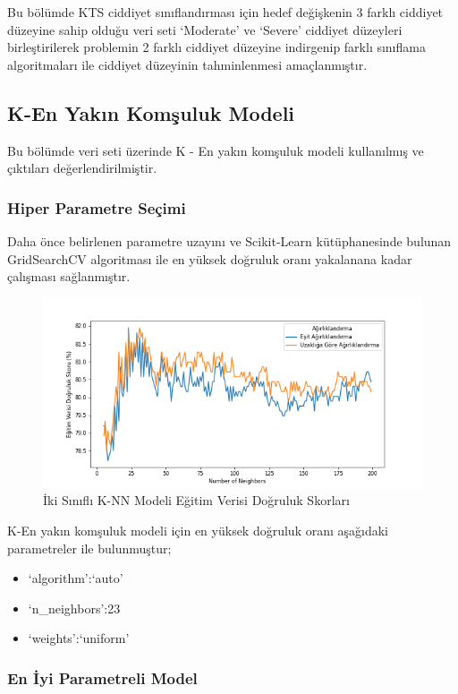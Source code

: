 \documentclass[12pt,twoside]{deuthesis}
\providecommand{\tightlist}{%
  \setlength{\itemsep}{0pt}\setlength{\parskip}{0pt}}
\begin{document}
Bu bölümde KTS ciddiyet sınıflandırması için hedef değişkenin 3 farklı ciddiyet düzeyine sahip olduğu veri seti `Moderate' ve `Severe' ciddiyet düzeyleri birleştirilerek problemin 2 farklı ciddiyet düzeyine indirgenip farklı sınıflama algoritmaları ile ciddiyet düzeyinin tahminlenmesi amaçlanmıştır.

\hypertarget{bin_knn}{%
\subsection{K-En Yakın Komşuluk Modeli}\label{bin_knn}}

Bu bölümde veri seti üzerinde K - En yakın komşuluk modeli kullanılmış ve çıktıları değerlendirilmiştir.

\hypertarget{hiper-parametre-seuxe7imi-4}{%
\subsubsection{Hiper Parametre Seçimi}\label{hiper-parametre-seuxe7imi-4}}

Daha önce belirlenen parametre uzayını ve Scikit-Learn kütüphanesinde bulunan GridSearchCV algoritması ile en yüksek doğruluk oranı yakalanana kadar çalışması sağlanmıştır.
\begin{figure}

{\centering \includegraphics[width=1.1\linewidth,height=0.55\textheight]{figure/KNN_bin_Grid_Graph} 

}

\caption{İki Sınıflı K-NN Modeli Eğitim Verisi Doğruluk Skorları}\label{fig:unnamed-chunk-52}
\end{figure}
\newpage

K-En yakın komşuluk modeli için en yüksek doğruluk oranı aşağıdaki parametreler ile bulunmuştur;
\begin{itemize}
\tightlist
\item
  `algorithm':`auto'\\
\item
  `n\_neighbors':23\\
\item
  `weights':`uniform'
\end{itemize}
\hypertarget{en-iyi-parametreli-model-2}{%
\subsubsection{En İyi Parametreli Model}\label{en-iyi-parametreli-model-2}}
\end{document}
